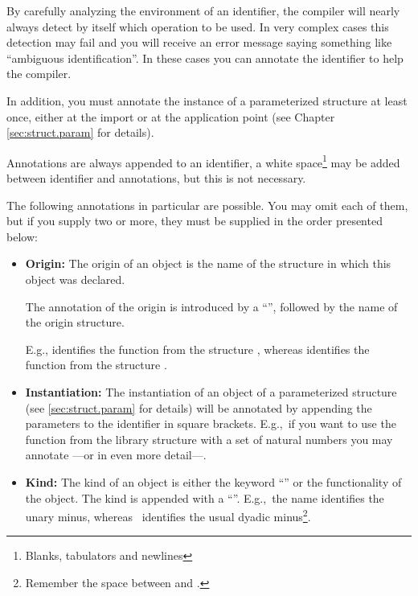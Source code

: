  By carefully analyzing the environment of an identifier,  the
 compiler will nearly always detect by itself which operation to be 
used.
In very complex cases this detection may fail and you will receive an error
message saying something like ``ambiguous identification''.
In these cases you can annotate the identifier to help the compiler.

\advanced
In addition, you must annotate the instance of a parameterized structure
at least once, either at the import or at the application point (see
Chapter \ref{sec:struct.param} for details).

\medskip
 Annotations are always appended to an identifier, a white
space\footnote{Blanks, tabulators and newlines}  may be
added between identifier and annotations, but this is not necessary.

 The following annotations in particular are possible. You may omit
each of them, but if you supply two or more, they must be supplied in
the order presented below:
\begin{itemize}
\item{\bf Origin:} The origin of an object is the name of the
  structure in which this object was declared. 

The annotation of  the origin is introduced by a ``'', followed by
the name of the origin structure.

E.g.,  identifies the function \pro{-} from the structure
, whereas  identifies the function \pro{-} from the
structure .

\item{\bf Instantiation:} The instantiation of an object of a
  parameterized structure (see \ref{sec:struct.param} for details)
  will be annotated by appending the parameters  to
  the identifier in square brackets.
E.g.,~if you want to use the function  from the library
structure  with a set of natural numbers you may annotate
---or in even more detail---. 

\item {\bf  Kind:} The kind of an object is either the keyword
  ``'' or the functionality of the object.
The kind is appended with a ``\pro{:}''. E.g.,~the name
\/ identifies the unary minus, whereas
\ identifies the usual dyadic minus\footnote{%
Remember the space between \pro{-} and \pro{:}.}. 
\end{itemize}





